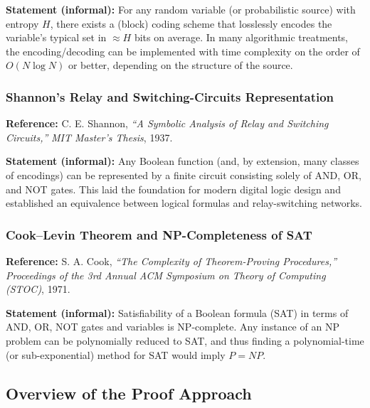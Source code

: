\documentclass{report}
\begin{document}
\textbf{Statement (informal):}  
For any random variable (or probabilistic source) with entropy \( H \), there exists a (block) coding scheme that losslessly encodes the variable’s typical set in \( \approx H \) bits on average. In many algorithmic treatments, the encoding/decoding can be implemented with time complexity on the order of \( O(N \log N) \) or better, depending on the structure of the source.

\subsubsection*{Shannon’s Relay and Switching-Circuits Representation}
\textbf{Reference:} C. E. Shannon, \textit{“A Symbolic Analysis of Relay and Switching Circuits,”} \textit{MIT Master’s Thesis}, 1937.  

\textbf{Statement (informal):}  
Any Boolean function (and, by extension, many classes of encodings) can be represented by a finite circuit consisting solely of AND, OR, and NOT gates. This laid the foundation for modern digital logic design and established an equivalence between logical formulas and relay-switching networks.

\subsubsection*{Cook–Levin Theorem and NP-Completeness of SAT}
\textbf{Reference:} S. A. Cook, \textit{“The Complexity of Theorem-Proving Procedures,”} \textit{Proceedings of the 3rd Annual ACM Symposium on Theory of Computing (STOC)}, 1971.  

\textbf{Statement (informal):}  
Satisfiability of a Boolean formula (SAT) in terms of AND, OR, NOT gates and variables is NP-complete. Any instance of an NP problem can be polynomially reduced to SAT, and thus finding a polynomial-time (or sub-exponential) method for SAT would imply \( P = NP \).

\subsection*{Overview of the Proof Approach}
\end{document}
